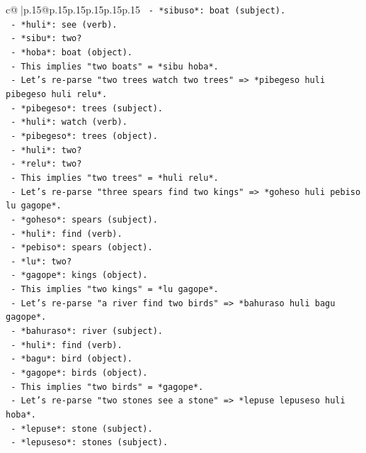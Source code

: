 \documentclass{article}
\begin{document}
{\begin{supertabular}{c@{$\;$}|p{.15\linewidth}@{}p{.15\linewidth}p{.15\linewidth}p{.15\linewidth}p{.15\linewidth}p{.15\linewidth}}
{{{\texttt{      {-} *sibuso*: boat (subject).} \\
\texttt{      {-} *huli*: see (verb).} \\
\texttt{      {-} *sibu*: two?} \\
\texttt{      {-} *hoba*: boat (object).} \\
\texttt{      {-} This implies "two boats" = *sibu hoba*.} \\
\texttt{    {-} Let's re{-}parse "two trees watch two trees" => *pibegeso huli pibegeso huli relu*.} \\
\texttt{      {-} *pibegeso*: trees (subject).} \\
\texttt{      {-} *huli*: watch (verb).} \\
\texttt{      {-} *pibegeso*: trees (object).} \\
\texttt{      {-} *huli*: two?} \\
\texttt{      {-} *relu*: two?} \\
\texttt{      {-} This implies "two trees" = *huli relu*.} \\
\texttt{    {-} Let's re{-}parse "three spears find two kings" => *goheso huli pebiso lu gagope*.} \\
\texttt{      {-} *goheso*: spears (subject).} \\
\texttt{      {-} *huli*: find (verb).} \\
\texttt{      {-} *pebiso*: spears (object).} \\
\texttt{      {-} *lu*: two?} \\
\texttt{      {-} *gagope*: kings (object).} \\
\texttt{      {-} This implies "two kings" = *lu gagope*.} \\
\texttt{    {-} Let's re{-}parse "a river find two birds" => *bahuraso huli bagu gagope*.} \\
\texttt{      {-} *bahuraso*: river (subject).} \\
\texttt{      {-} *huli*: find (verb).} \\
\texttt{      {-} *bagu*: bird (object).} \\
\texttt{      {-} *gagope*: birds (object).} \\
\texttt{      {-} This implies "two birds" = *gagope*.} \\
\texttt{    {-} Let's re{-}parse "two stones see a stone" => *lepuse lepuseso huli hoba*.} \\
\texttt{      {-} *lepuse*: stone (subject).} \\
\texttt{      {-} *lepuseso*: stones (subject).} \\
}}}
\end{supertabular}}
\end{document}
